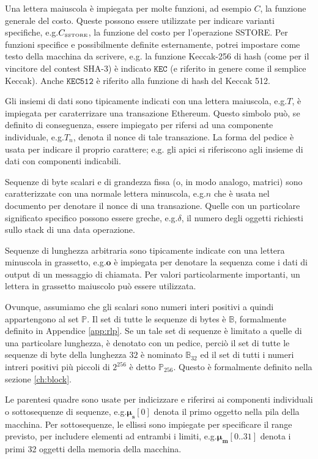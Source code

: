 \documentclass[9pt,oneside]{amsart}
\makeatletter
\newcommand*\eg{e.g.\@\xspace}
\makeatother
\begin{document}
\begin{multicols}{2}
Una lettera maiuscola è impiegata per molte funzioni, ad esempio $C$, la funzione generale del costo. Queste possono essere utilizzate per indicare varianti specifiche, \eg $C_\text{\tiny SSTORE}$, la funzione del costo per l'operazione {\tiny SSTORE}. Per funzioni specifice e possibilmente definite esternamente, potrei impostare come testo della macchina da scrivere, \eg la funzione Keccak-256 di hash (come per il vincitore del contest SHA-3) è indicato $\texttt{KEC}$ (e riferito in genere come il semplice Keccak). Anche $\texttt{KEC512}$ è riferito alla funzione di hash del Keccak 512.

Gli insiemi di dati sono tipicamente indicati con una lettera maiuscola, \eg $T$, è impiegata per caraterrizare una transazione Ethereum. Questo simbolo può, se definito di conseguenza, essere impiegato per rifersi ad una componente individuale, \eg $T_n$, denota il nonce di tale transazione. La forma del pedice è usata per indicare il proprio carattere; \eg gli apici si riferiscono agli insieme di dati con componenti indicabili.

Sequenze di byte scalari e di grandezza fissa (o, in modo analogo, matrici) sono caratterizzate con una normale lettera minuscola, \eg $n$ che è usata nel documento per denotare il nonce di una transazione. Quelle con un particolare significato specifico possono essere greche, \eg $\delta$, il numero degli oggetti richiesti sullo stack di una data operazione.

Sequenze di lunghezza arbitraria sono tipicamente indicate con una lettera minuscola in grassetto, \eg $\mathbf{o}$ è impiegata per denotare la sequenza come i dati di output di un messaggio di chiamata. Per valori particolarmente importanti, un lettera in grassetto maiuscolo può essere utilizzata.

Ovunque, assumiamo che gli scalari sono numeri interi positivi a quindi appartengono al set $\mathbb{P}$. Il set di tutte le sequenze di bytes è $\mathbb{B}$, formalmente definito in Appendice \ref{app:rlp}. Se un tale set di sequenze è limitato a quelle di una particolare lunghezza, è denotato con un pedice, perciò il set di tutte le sequenze di byte della lunghezza $32$ è nominato $\mathbb{B}_{32}$ ed il set di tutti i numeri intreri positivi più piccoli di $2^{256}$ è detto $\mathbb{P}_{256}$. Questo è formalmente definito nella sezione \ref{ch:block}.

Le parentesi quadre sono usate per indicizzare e riferirsi ai componenti individuali o sottosequenze di sequenze, \eg $\boldsymbol{\mu}_\mathbf{s}[0]$ denota il primo oggetto nella pila della macchina. Per sottosequenze, le ellissi sono impiegate per specificare il range previsto, per includere elementi ad entrambi i limiti, \eg $\boldsymbol{\mu}_\mathbf{m}[0..31]$ denota i primi 32 oggetti della memoria della macchina.


\end{multicols}
\end{document}
